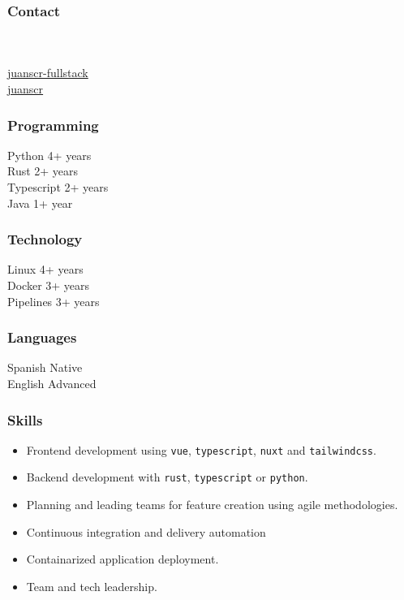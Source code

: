 \documentclass[11pt,a4paper]{article}
\begin{document}
{
%
\sloppy
%
\subsubsection*{Contact}
%
{\Large\faPhone} \myphone \vspace{0.3cm} \\
%
{\Large\faAt} \myemail \vspace{0.3cm} \\
%
{\Large\faLinkedin}
\href{https://www.linkedin.com/in/juanscr-fullstack}{juanscr-fullstack}
\vspace{0.3cm} \\
%
{\large\faGithub}  \href{https://github.com/juanscr}{juanscr}
%
\subsubsection*{Programming}
%
{\Large\faPython} Python \hfill 4+ years \vspace{0.3cm} \\
%
{\Large\faRust} Rust \hfill 2+ years \vspace{0.3cm} \\
%
{\Large\faJs} Typescript \hfill 2+ years \vspace{0.3cm} \\
%
{\Large\faJava} Java \hfill 1+ year
%
\subsubsection*{Technology}
%
{\Large\faLinux} Linux \hfill 4+ years \vspace{0.3cm} \\
%
{\Large\faRust} Docker \hfill 3+ years \vspace{0.3cm} \\
%
{\Large\faBitbucket} Pipelines \hfill 3+ years
%
\subsubsection*{Languages}
%
Spanish \hfill Native \vspace{0.3cm} \\
%
English \hfill Advanced
%
\subsubsection*{Skills}
%
\begin{itemize}[leftmargin=*]
%
    \item Frontend development using \texttt{vue}, \texttt{typescript},
        \texttt{nuxt} and \texttt{tailwindcss}.
%
    \item Backend development with \texttt{rust}, \texttt{typescript} or
        \texttt{python}.
%
    \item Planning and leading teams for feature creation using agile
        methodologies.
%
    \item Continuous integration and delivery automation
%
    \item Containarized application deployment.
%
    \item Team and tech leadership.
%
\end{itemize}
%
}
\end{document}
